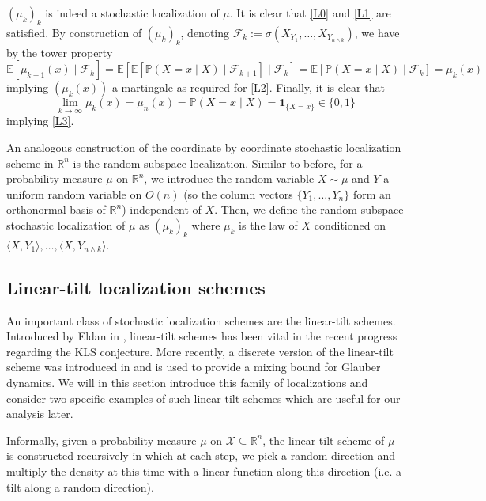 \((\mu_k)_{k}\) is indeed a stochastic localization of \(\mu\). It is clear that \eqref{L0} and \eqref{L1} are 
satisfied. By construction of \((\mu_k)_k\), denoting 
\(\mathscr{F}_k := \sigma(X_{Y_1}, \ldots, X_{Y_{n \wedge k}})\), we have by the tower property
\[\mathbb{E}[\mu_{k + 1}(x) \mid \mathscr{F}_k] 
  = \mathbb{E}[\mathbb{E}[\mathbb{P}(X = x \mid X) \mid \mathscr{F}_{k + 1}] \mid \mathscr{F}_k]
  = \mathbb{E}[\mathbb{P}(X = x \mid X) \mid \mathscr{F}_k] = \mu_k(x)\]
implying \((\mu_k(x))\) a martingale as required for \eqref{L2}. Finally, it is clear that
\[\lim_{k \to \infty} \mu_k(x) = \mu_n(x) = \mathbb{P}(X = x \mid X) = \mathbf{1}_{\{X = x\}} \in \{0, 1\}\]
implying \eqref{L3}.

An analogous construction of the coordinate by coordinate stochastic localization scheme in \(\mathbb{R}^n\) 
is the random subspace localization. Similar to before, for a probability measure \(\mu\) on \(\mathbb{R}^n\),
we introduce the random variable \(X \sim \mu\) and \(Y\) a uniform random variable on \(O(n)\) 
(so the column vectors \(\{Y_1, \ldots, Y_n\}\) form an orthonormal basis of \(\mathbb{R}^n\)) 
independent of \(X\). Then, we define the random subspace stochastic localization of \(\mu\) as \((\mu_k)_k\) 
where \(\mu_k\) is the law of \(X\) conditioned on \(\langle X, Y_1\rangle, \ldots, \langle X, Y_{n \wedge k}\rangle\).

\subsection{Linear-tilt localization schemes}

An important class of stochastic localization schemes are the linear-tilt schemes. Introduced by Eldan 
in \cite{Eldan_2013}, linear-tilt schemes has been vital in the recent progress regarding the KLS 
conjecture. More recently, a discrete version of the linear-tilt scheme was introduced in \cite{Chen_2022}
and is used to provide a mixing bound for Glauber dynamics. We will in this section introduce this family 
of localizations and consider two specific examples of such linear-tilt schemes which are 
useful for our analysis later.

Informally, given a probability measure \(\mu\) on \(\mathcal{X} \subseteq \mathbb{R}^n\), the linear-tilt scheme
of \(\mu\) is constructed recursively in which at each step, we pick a random direction and multiply 
the density at this time with a linear function along this direction (i.e. a tilt along a random 
direction). 

